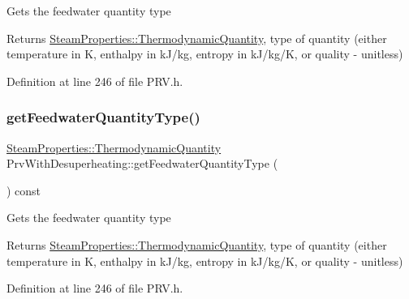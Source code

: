 Gets the feedwater quantity type

\begin{DoxyReturn}{Returns}
\hyperlink{class_steam_properties_ae0294bedf7d178c2d8fb6aed0f62fbff}{Steam\+Properties\+::\+Thermodynamic\+Quantity}, type of quantity (either temperature in K, enthalpy in k\+J/kg, entropy in k\+J/kg/K, or quality -\/ unitless) 
\end{DoxyReturn}


Definition at line 246 of file P\+R\+V.\+h.

\mbox{\label{class_prv_with_desuperheating_aa6901e00ecf819d95f79c20ef1775876}} 
\subsubsection{\texorpdfstring{get\+Feedwater\+Quantity\+Type()}{getFeedwaterQuantityType()}\hspace{0.1cm}{\footnotesize\ttfamily [2/3]}}
{\footnotesize\ttfamily \hyperlink{class_steam_properties_ae0294bedf7d178c2d8fb6aed0f62fbff}{Steam\+Properties\+::\+Thermodynamic\+Quantity} Prv\+With\+Desuperheating\+::get\+Feedwater\+Quantity\+Type (\begin{DoxyParamCaption}{ }\end{DoxyParamCaption}) const\hspace{0.3cm}{\ttfamily [inline]}}

Gets the feedwater quantity type

\begin{DoxyReturn}{Returns}
\hyperlink{class_steam_properties_ae0294bedf7d178c2d8fb6aed0f62fbff}{Steam\+Properties\+::\+Thermodynamic\+Quantity}, type of quantity (either temperature in K, enthalpy in k\+J/kg, entropy in k\+J/kg/K, or quality -\/ unitless) 
\end{DoxyReturn}


Definition at line 246 of file P\+R\+V.\+h.

\mbox{\label{class_prv_with_desuperheating_aa6901e00ecf819d95f79c20ef1775876}} 
